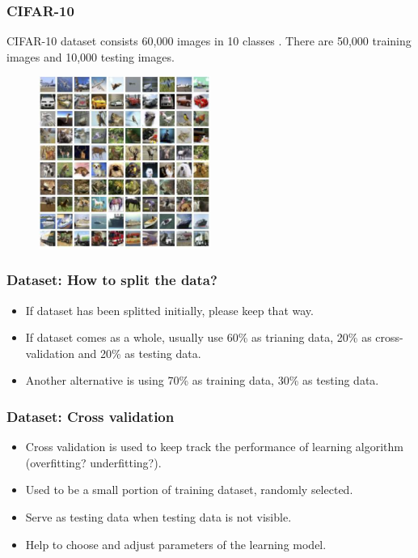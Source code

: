 \documentclass{beamer}
\begin{document}
\begin{frame}
    \frametitle{CIFAR-10}

    CIFAR-10 dataset consists 60,000 images in 10 classes \cite{krizhevsky2009}. There are 50,000 training images and 10,000 testing images.

    \begin{figure}
      \centering
      \includegraphics[width=0.5\textwidth]{cifar10.png}
    \end{figure}
\end{frame}

\begin{frame}
    \frametitle{Dataset: How to split the data?}

    \begin{itemize}
      \item[\ding{44}] If dataset has been splitted initially, please keep that way.
      \item[\ding{44}] If dataset comes as a whole, usually use 60\% as trianing data, 20\% as cross-validation and 20\% as testing data. 
      \item[\ding{44}] Another alternative is using 70\% as training data, 30\% as testing data.
    \end{itemize}
\end{frame}

\begin{frame}
    \frametitle{Dataset: Cross validation}

    \begin{itemize}
      \item[\ding{118}] Cross validation is used to keep track the performance of learning algorithm (overfitting? underfitting?).
      \item[\ding{118}] Used to be a small portion of training dataset, randomly selected.
      \item[\ding{118}] Serve as testing data when testing data is not visible.
      \item[\ding{118}] Help to choose and adjust parameters of the learning model.
    \end{itemize}
\end{frame}
\end{document}
